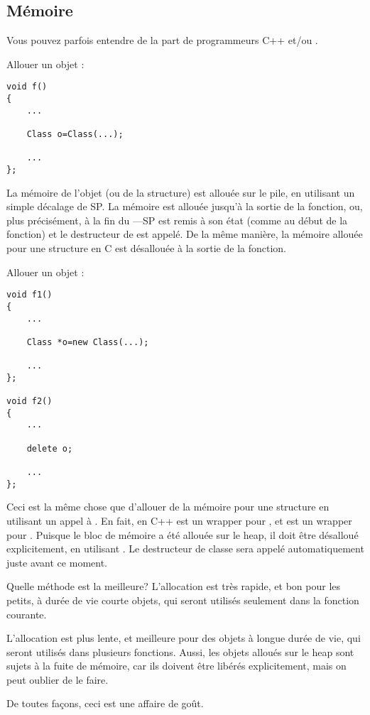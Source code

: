 \subsection{Mémoire}

Vous pouvez parfois entendre de la part de programmeurs C++ 
et/ou .

Allouer un objet :

\begin{lstlisting}[style=customc]
void f()
{
	...

	Class o=Class(...);

	...
};
\end{lstlisting}

La mémoire de l'objet (ou de la structure) est allouée sur le pile, en utilisant
un simple décalage de \ac{SP}.
La mémoire est allouée jusqu'à la sortie de la fonction, ou, plus précisément, à
la fin du ---\ac{SP} est remis à son état (comme au début de la fonction)
et le destructeur de  est appelé.
De la même manière, la mémoire allouée pour une structure en C est désallouée à la
sortie de la fonction.

Allouer un objet :

\begin{lstlisting}[style=customc]
void f1()
{
	...

	Class *o=new Class(...);

	...
};

void f2()
{
	...

	delete o;

	...
};
\end{lstlisting}

Ceci est la même chose que d'allouer de la mémoire pour une structure en utilisant
un appel à .
En fait,  en C++ est un wrapper pour , et  est un
wrapper pour .
Puisque le bloc de mémoire a été allouée sur le \gls{heap}, il doit être désalloué
explicitement, en utilisant .
Le destructeur de classe sera appelé automatiquement juste avant ce moment.

Quelle méthode est la meilleure?
L'allocation  est très rapide, et bon pour les petits, à durée de
vie courte objets, qui seront utilisés seulement dans la fonction courante.

L'allocation  est plus lente, et meilleure pour des objets à longue
durée de vie, qui seront utilisés dans plusieurs fonctions.
Aussi, les objets alloués sur le \gls{heap} sont sujets à la fuite de mémoire, car
ils doivent être libérés explicitement, mais on peut oublier de le faire.

De toutes façons, ceci est une affaire de goût.
